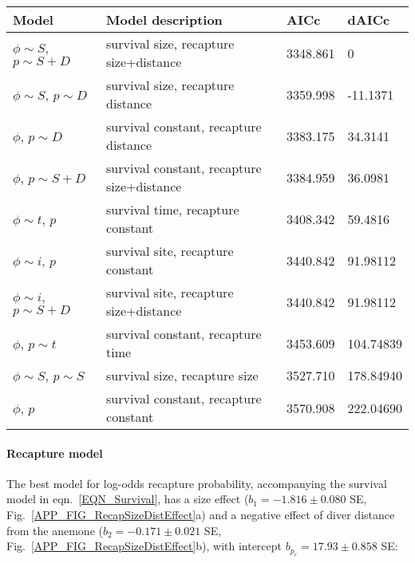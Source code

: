 \documentclass[12pt, oneside]{article}   	%
\begin{document}
\begin{table}
\begin{centering}
\begin{tabular}{|p{2in}|p{2.5in}|p{0.75in}|p{0.75in}|}
\hline 
\textbf{Model} & \textbf{Model description} & \textbf{AICc} & \textbf{dAICc} \\ \hline
$\phi \sim S$, $p \sim S+D$ & survival size, recapture size+distance & 3348.861 & 0 \\ \hline
$\phi \sim S$, $p \sim D$ & survival size, recapture distance & 3359.998 & -11.1371 \\ \hline
$\phi$, $p \sim D$ & survival constant, recapture distance & 3383.175 & 34.3141 \\ \hline
$\phi$, $p \sim S+D$ & survival constant, recapture size+distance & 3384.959 & 36.0981 \\ \hline
$\phi \sim t$, $p$ & survival time, recapture constant & 3408.342 & 59.4816 \\ \hline
$\phi \sim i$, $p$ & survival site, recapture constant & 3440.842 & 91.98112 \\ \hline
$\phi \sim i$, $p \sim S+D$ & survival site, recapture size+distance & 3440.842 & 91.98112 \\ \hline
$\phi$, $p \sim t$ & survival constant, recapture time & 3453.609 & 104.74839 \\ \hline
$\phi \sim S$, $p \sim S$ & survival size, recapture size & 3527.710 & 178.84940 \\ \hline
$\phi$, $p$ & survival constant, recapture constant & 3570.908 & 222.04690 \\ \hline
\end{tabular}
\end{centering}
\caption{}\label{APP_TAB_MARKmodels}
\end{table}

\paragraph{Recapture model} 
The best model for log-odds recapture probability, accompanying the survival model in eqn.\ \ref{EQN_Survival}, has a size effect ($b_1 = -1.816 \pm 0.080$ SE, Fig.\ \ref{APP_FIG_RecapSizeDistEffect}a) and a negative effect of diver distance from the anemone ($b_2 = -0.171 \pm 0.021$ SE, Fig.\ \ref{APP_FIG_RecapSizeDistEffect}b), with intercept $b_{p_r} = 17.93 \pm 0.858$ SE:
\end{document}
